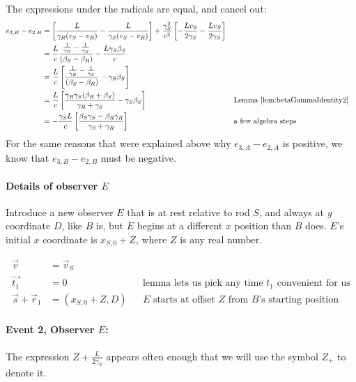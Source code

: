 \documentclass[a4paper]{article}
\theoremstyle{plain}
\theoremstyle{definition}
\newcommand{\vect}[1]{\vec{#1}}
\begin{document}
The expressions under the radicals are equal, and cancel out:
\begin{align}
e_{3,B}-e_{2,B}
  & = \left[ \frac{L}{\gamma_R(v_S - v_R)} - \frac{L}{\gamma_S(v_S - v_R)} \right] + \frac{\gamma_S^2}{c^2} \left[ -\frac{Lv_S}{2\gamma_S} - \frac{Lv_S}{2\gamma_S} \right] \nonumber \\
  & = \frac{L}{c} \frac{\frac{1}{\gamma_R} - \frac{1}{\gamma_S}}{(\beta_S - \beta_R)} - \frac{L\gamma_S\beta_S}{c} \nonumber \\
  & = \frac{L}{c} \left[ \frac{\frac{1}{\gamma_R} - \frac{1}{\gamma_S}}{(\beta_S - \beta_R)} - \gamma_S\beta_S \right] \label{eqn:scen2b-observerB-step1} \\
  & = \frac{L}{c} \left[ \frac{\gamma_R\gamma_S(\beta_R+\beta_S)}{\gamma_R+\gamma_S} - \gamma_S\beta_S \right] & & \text{Lemma~\ref{lem:betaGammaIdentity2}} \nonumber \\
  & = -\frac{\gamma_S L}{c} \left[ \frac{\beta_S\gamma_S - \beta_R\gamma_R}{\gamma_S + \gamma_R} \right] & & \text{a few algebra steps} \label{eqn:scen2b-observerB-finalstep}
\end{align}
For the same reasons that were explained above why $e_{3,A}-e_{2,A}$
is positive, we know that $e_{3,B}-e_{2,B}$ must be negative.


\paragraph{Details of observer $E$}

Introduce a new observer $E$ that is at rest relative to rod $S$, and
always at $y$ coordinate $D$, like $B$ is, but $E$ begins at a
different $x$ position than $B$ does.  $E$'s initial $x$ coordinate is
$x_{S,0} + Z$, where $Z$ is any real number.

\begin{align}
\vect{v} & = \vect{v}_S \\
\vect{t_1} & = 0 & & \text{lemma lets us pick any time $t_1$ convenient for us} \\
\vect{s} + \vect{r}_1 & = (x_{S,0} + Z, D) & & \text{$E$ starts at offset $Z$ from $B$'s starting position}
\end{align}


\paragraph{Event 2, Observer $E$:}

The expression $Z + \frac{L}{2\gamma_S}$ appears often enough that we
will use the symbol $Z_{+}$ to denote it.
\end{document}
